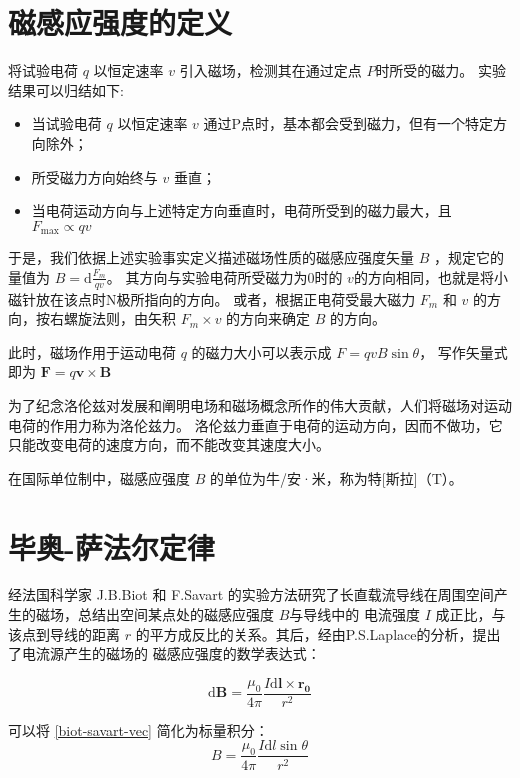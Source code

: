 \section{磁感应强度的定义}
将试验电荷 $q$ 以恒定速率 $v$ 引入磁场，检测其在通过定点 $P$时所受的磁力。
实验结果可以归结如下:
\begin{itemize}
    \item 当试验电荷 $q$ 以恒定速率 $v$ 通过P点时，基本都会受到磁力，但有一个特定方向除外；
    \item 所受磁力方向始终与 $v$ 垂直；
    \item 当电荷运动方向与上述特定方向垂直时，电荷所受到的磁力最大，且 $ F_{\max} \propto qv $
\end{itemize}

于是，我们依据上述实验事实定义描述磁场性质的磁感应强度矢量 $B$ ，规定它的量值为
$B=\mathrm{d}\displaystyle \frac{F_{m}}{qv}$。
其方向与实验电荷所受磁力为0时的 $v$的方向相同，也就是将小磁针放在该点时N极所指向的方向。
或者，根据正电荷受最大磁力 $F_{m}$ 和 $v$ 的方向，按右螺旋法则，由矢积 $F_{m}\times v$ 的方向来确定 $B$ 的方向。

此时，磁场作用于运动电荷 $q$ 的磁力大小可以表示成 $F=qvB\sin \theta$，
写作矢量式即为 $\boldsymbol{F}=q\boldsymbol{v}\times \boldsymbol{B}$

为了纪念洛伦兹对发展和阐明电场和磁场概念所作的伟大贡献，人们将磁场对运动电荷的作用力称为洛伦兹力。
洛伦兹力垂直于电荷的运动方向，因而不做功，它只能改变电荷的速度方向，而不能改变其速度大小。

在国际单位制中，磁感应强度 $B$ 的单位为牛/安·米，称为特[斯拉]（T）。

\section{毕奥-萨法尔定律}
经法国科学家 J.B.Biot 和 F.Savart 的实验方法研究了长直载流导线在周围空间产生的磁场，总结出空间某点处的磁感应强度 $B$与导线中的
电流强度 $I$ 成正比，与该点到导线的距离 $r$ 的平方成反比的关系。其后，经由P.S.Laplace的分析，提出了电流源产生的磁场的
磁感应强度的数学表达式：

\begin{equation} 
    \label{biot-savart-vec}
    \mathrm{d} \boldsymbol{B} = \frac{\mu_0}{4\pi}\frac{I\mathrm{d} \boldsymbol{l}\times \boldsymbol{r_0}}{r^2}
\end{equation}

可以将 \autoref{biot-savart-vec} 简化为标量积分：
\begin{equation}
  \label{biot-savart-norm}
  B=\frac{\mu_0}{4\pi}\frac{I\mathrm{d} l\sin\theta}{r^2}
\end{equation}

